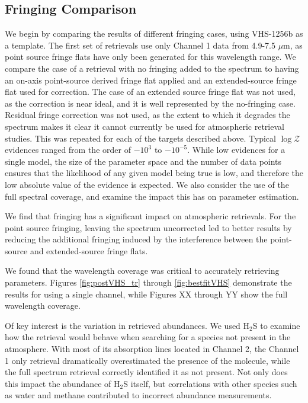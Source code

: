 \subsection{Fringing Comparison}
We begin by comparing the results of different fringing cases, using VHS-1256b as a template.
The first set of retrievals use only Channel 1 data from 4.9-7.5 $\mu$m, as point source fringe flats have only been generated for this wavelength range.
We compare the case of a retrieval with no fringing added to the spectrum to having an on-axis point-source derived fringe flat applied and an extended-source fringe flat used for correction.
The case of an extended source fringe flat was not used, as the correction is near ideal, and it is well represented by the no-fringing case.
Residual fringe correction was not used, as the extent to which it degrades the spectrum makes it clear it cannot currently be used for atmospheric retrieval studies.
This was repeated for each of the targets described above.
Typical $\log\mathcal{Z}$ evidences ranged from the order of $-10^{3}$ to $-10^{-5}$.
While low evidences for a single model, the size of the parameter space and the number of data points ensures that the likelihood of any given model being true is low, and therefore the low absolute value of the evidence is expected. 
We also consider the use of the full spectral coverage, and examine the impact this has on parameter estimation.

We find that fringing has a significant impact on atmospheric retrievals.
For the point source fringing, leaving the spectrum uncorrected led to better results by reducing the additional fringing induced by the interference between the point-source and extended-source fringe flats.

We found that the wavelength coverage was critical to accurately retrieving parameters. Figures \ref{fig:postVHS_tr} through \ref{fig:bestfitVHS} demonstrate the results for using a single channel, while Figures XX through YY show the full wavelength coverage.

Of key interest is the variation in retrieved abundances.
We used H$_{2}$S to examine how the retrieval would behave when searching for a species not present in the atmosphere. 
With most of its absorption lines located in Channel 2, the Channel 1 only retrieval dramatically overestimated the presence of the molecule, while the full spectrum retrieval correctly identified it as not present.
Not only does this impact the abundance of H$_{2}$S itself, but correlations with other species such as water and methane contributed to incorrect abundance measurements.

